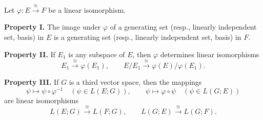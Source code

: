 Let $\varphi: E \xrightarrow{\cong} F$ be a linear isomorphism.

\textbf{Property I.} The image under $\varphi$ of a generating set (resp., linearly independent set, basis) in $E$ is a generating set (resp., linearly independent set, basis) in $F$.

\textbf{Property II.} If $E_1$ is any subspace of $E$, then $\varphi$ determines linear isomorphisms
$$
E_1 \xrightarrow{\cong} \varphi(E_1), \qquad E/E_1 \xrightarrow{\cong} \varphi(E)/\varphi(E_1).
$$

\textbf{Property III.} If $G$ is a third vector space, then the mappings
$$
\psi \mapsto \psi \circ \varphi^{-1} \quad (\psi \in L(E; G)), \qquad \psi \mapsto \varphi \circ \psi \quad (\psi \in L(G; E))
$$
are linear isomorphisms
$$
L(E; G) \xrightarrow{\cong} L(F; G), \qquad L(G; E) \xrightarrow{\cong} L(G; F).
$$
